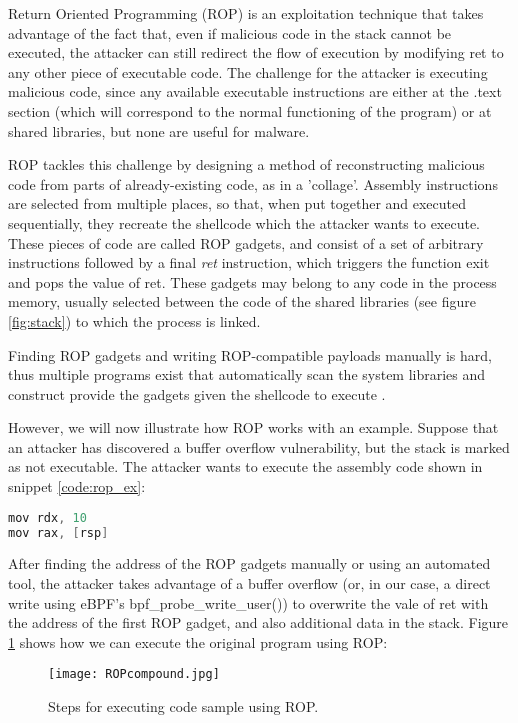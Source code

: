 Return Oriented Programming (ROP) is an exploitation technique that takes advantage of the fact that, even if malicious code in the stack cannot be executed, the attacker can still redirect the flow of execution by modifying ret to any other piece of executable code. The challenge for the attacker is executing malicious code, since any available executable instructions are either at the .text section (which will correspond to the normal functioning of the program) or at shared libraries, but none are useful for malware. 

ROP tackles this challenge by designing a method of reconstructing malicious code from parts of already-existing code, as in a 'collage'. Assembly instructions are selected from multiple places, so that, when put together and executed sequentially, they recreate the shellcode which the attacker wants to execute. These pieces of code are called ROP gadgets, and consist of a set of arbitrary instructions followed by a final \textit{ret} instruction, which triggers the function exit and pops the value of ret. These gadgets may belong to any code in the process memory, usually selected between the code of the shared libraries (see figure \ref{fig:stack}) to which the process is linked.

Finding ROP gadgets and writing ROP-compatible payloads manually is hard, thus multiple programs exist that automatically scan the system libraries and construct provide the gadgets given the shellcode to execute \cite{rop_prog_finder}.

However, we will now illustrate how ROP works with an example. Suppose that an attacker has discovered a buffer overflow vulnerability, but the stack is marked as not executable. The attacker wants to execute the assembly code shown in snippet \ref{code:rop_ex}:

\begin{lstlisting}[language=C, caption={Sample program to run using ROP.}, label={code:rop_ex}]
mov rdx, 10
mov rax, [rsp]
\end{lstlisting}

After finding the address of the ROP gadgets manually or using an automated tool, the attacker takes advantage of a buffer overflow (or, in our case, a direct write using eBPF's bpf\_probe\_write\_user()) to overwrite the vale of ret with the address of the first ROP gadget, and also additional data in the stack. Figure \ref{fig:rop_compund} shows how we can execute the original program using ROP:

\begin{figure}[htbp]
	\centering
	\texttt{[image: ROPcompound.jpg]}
	\caption{Steps for executing code sample using ROP.}
	\label{fig:rop_compund}
\end{figure}


